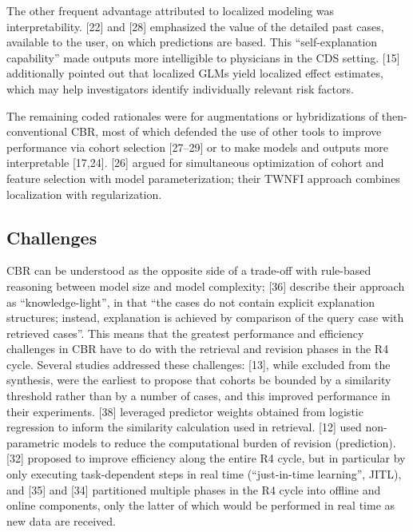 \documentclass[preprint, 3p,
authoryear]{elsarticle} %
\begin{document}
The other frequent advantage attributed to localized modeling was
interpretability. {[}22{]} and {[}28{]} emphasized the value of the
detailed past cases, available to the user, on which predictions are
based. This ``self-explanation capability'' made outputs more
intelligible to physicians in the CDS setting. {[}15{]} additionally
pointed out that localized GLMs yield localized effect estimates, which
may help investigators identify individually relevant risk factors.

The remaining coded rationales were for augmentations or hybridizations
of then-conventional CBR, most of which defended the use of other tools
to improve performance via cohort selection {[}27--29{]} or to make
models and outputs more interpretable {[}17,24{]}. {[}26{]} argued for
simultaneous optimization of cohort and feature selection with model
parameterization; their TWNFI approach combines localization with
regularization.

\hypertarget{challenges}{%
\subsection{Challenges}\label{challenges}}

CBR can be understood as the opposite side of a trade-off with
rule-based reasoning between model size and model complexity; {[}36{]}
describe their approach as ``knowledge-light'', in that ``the cases do
not contain explicit explanation structures; instead, explanation is
achieved by comparison of the query case with retrieved cases''. This
means that the greatest performance and efficiency challenges in CBR
have to do with the retrieval and revision phases in the R4 cycle.
Several studies addressed these challenges: {[}13{]}, while excluded
from the synthesis, were the earliest to propose that cohorts be bounded
by a similarity threshold rather than by a number of cases, and this
improved performance in their experiments. {[}38{]} leveraged predictor
weights obtained from logistic regression to inform the similarity
calculation used in retrieval. {[}12{]} used non-parametric models to
reduce the computational burden of revision (prediction). {[}32{]}
proposed to improve efficiency along the entire R4 cycle, but in
particular by only executing task-dependent steps in real time
(``just-in-time learning'', JITL), and {[}35{]} and {[}34{]} partitioned
multiple phases in the R4 cycle into offline and online components, only
the latter of which would be performed in real time as new data are
received.
\end{document}
